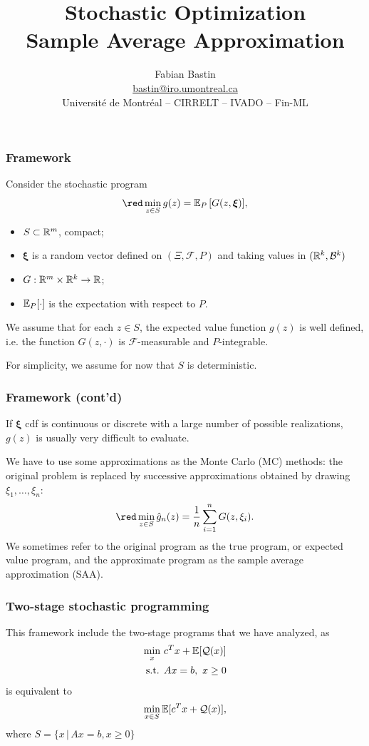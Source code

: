 \documentclass{beamer}
\title[SAA]{Stochastic Optimization\\Sample Average Approximation}
\author[Fabian Bastin]{Fabian Bastin \\ \url{bastin@iro.umontreal.ca} \\ Université de Montréal -- CIRRELT -- IVADO -- Fin-ML}
\date{}
\def\bxi{\boldsymbol\xi}
\def\cQ{\mathcal{Q}}
\begin{document}
\frame{\titlepage}

\begin{frame}
\frametitle{Framework}

Consider the stochastic program
\[
{\red \min_{z \in S} g(z) = \EE_P \left[ G(z, \bxi) \right]},
\]
\vspace{-0.5cm}
\begin{itemize}
\item 
$S \subset \mathbb{R}^m$, compact;
\item
$\bxi$ is a random vector defined on $( \Xi, \mathcal{F}, P )$ and taking values in $( \mathbb{R}^k, \mathcal{B}^k )$ %
\item
$G: \mathbb{R}^m \times \mathbb{R}^k \rightarrow \mathbb{R}$;
\item
${\mathbb{E}}_P[\cdot]$ is the expectation with respect to $P$.
\end{itemize}

We assume that for each $z \in S$, the expected value function $g(z)$ is well defined, i.e. the function $G(z,\cdot)$ is $\mathcal{F}$-measurable and $P$-integrable.

\mbox{}

For simplicity, we assume for now that {\blue $S$ is deterministic}.

\end{frame}

\begin{frame}
\frametitle{Framework (cont'd)}

If $\bxi$ cdf is continuous or discrete with a large number of possible realizations, $g(z)$ is usually very difficult to evaluate.

\mbox{}

We have to use some approximations as the Monte Carlo (MC) methods: the original problem is replaced by successive approximations obtained by drawing $\xi_1,\ldots{}, \xi_n$:
\[
{\red \min_{z \in S} \hat{g}_n(z) = \frac{1}{n} \sum_{i = 1}^n
  G(z, \xi_i)}.
\]
We sometimes refer to the original program as the {\blue true program}, or {\blue expected value program}, and the approximate program as the {\blue sample average approximation (SAA)}.

\end{frame}

\begin{frame}
\frametitle{Two-stage stochastic programming}

This framework include the two-stage programs that we have analyzed, as
\begin{align*}
\min_x\ & c^Tx + \EE[\cQ(x)] \\
\mbox{s.t. } & Ax = b,\ x \geq 0
\end{align*}
is equivalent to
$$
\min_{x \in S} \EE[c^Tx + \cQ(x)],
$$
where $S = \{ x \,|\, Ax = b, x \geq 0 \}$

\end{frame}
\end{document}
